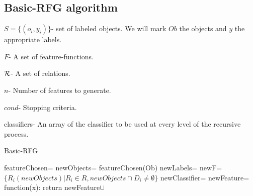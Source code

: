 \documentclass[letterpaper]{article}
\theoremstyle{definition}
\begin{document}
\begin{appendices}
\pagebreak

%
%
%
%
%
%
%
%

\section{Basic-RFG algorithm} \label{app:2}
\begin{algorithm}[H]
$S=\{(o_{i},y_{i})\}$- set of labeled objects. We will mark $Ob$ the objects and $y$ the appropriate labels.

$F$- A set of feature-functions.

$\cal R$- A set of relations.

$n$- Number of features to generate.

$cond$- Stopping criteria.

classifiers- An array of the classifier to be used at every level of the recursive process.

\caption{Basic-RFG}
\label{code2}
\begin{algorithmic}
    \State
    \Return {}
\EndIf
\State featureChosen= 
\State newObjects= featureChosen(Ob)
\State newLabels= 
\State newF= $\{R_{i}(newObjects)|R_{i}\in R, newObjects\cap D_{i}\neq\emptyset\}$
\State newClassifier= 
\State newFeature= function(x): return 
\State
\Return newFeature$\cup$ 
\EndFunction


\end{algorithmic}
\end{algorithm}
\end{appendices}
\end{document}
